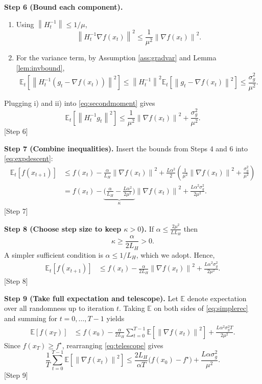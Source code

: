 \documentclass{article}
\newcommand{\E}{\mathbb{E}}
\newcommand{\norm}[1]{\left\lVert #1\right\rVert}
\begin{document}
\noindent\textbf{Step 6 (Bound each component).}
\begin{enumerate}[label=\roman*)]
    \item Using $\norm{H_t^{-1}}\le 1/\mu$,
    \[
        \norm{H_t^{-1}\nabla f(x_t)}^{2}\le\frac{1}{\mu^{2}}\norm{\nabla f(x_t)}^{2}.
    \]
    \item For the variance term, by Assumption \ref{ass:gradvar} and Lemma \ref{lem:invbound},
    \[
        \E_t\!\left[\norm{H_t^{-1}(g_t-\nabla f(x_t))}^{2}\right]
        \le \norm{H_t^{-1}}^{2}\E_t\!\left[\norm{g_t-\nabla f(x_t)}^{2}\right]
        \le\frac{\sigma_g^{2}}{\mu^{2}} .
    \]
\end{enumerate}
Plugging i) and ii) into \eqref{eq:secondmoment} gives
\[
    \E_t\!\left[\norm{H_t^{-1}g_t}^{2}\right]
    \le\frac{1}{\mu^{2}}\norm{\nabla f(x_t)}^{2}+\frac{\sigma_g^{2}}{\mu^{2}}.
    \tag{7}\label{eq:boundsecond}
\]
[Step 6]

\noindent\textbf{Step 7 (Combine inequalities).}  
Insert the bounds from Steps 4 and 6 into \eqref{eq:expdescent}:
\begin{align}
    \E_t[f(x_{t+1})]
    &\le f(x_t)-\frac{\alpha}{L_H}\norm{\nabla f(x_t)}^{2}
      +\frac{L\alpha^{2}}{2}\!\left(\frac{1}{\mu^{2}}\norm{\nabla f(x_t)}^{2}
      +\frac{\sigma_g^{2}}{\mu^{2}}\right) \nonumber\\[0.4em]
    &= f(x_t)-\underbrace{\Big(\frac{\alpha}{L_H}
        -\frac{L\alpha^{2}}{2\mu^{2}}\Big)}_{\displaystyle\kappa}
        \norm{\nabla f(x_t)}^{2}
      +\frac{L\alpha^{2}\sigma_g^{2}}{2\mu^{2}} .
    \tag{8}\label{eq:recursion}
\end{align}
[Step 7]

\noindent\textbf{Step 8 (Choose step size to keep $\kappa>0$).}  
If $\alpha\le\frac{2\mu^{2}}{L L_H}$ then
\[
    \kappa\ge\frac{\alpha}{2L_H}>0.
\]
A simpler sufficient condition is $\alpha\le 1/L_H$, which we adopt. Hence,
\begin{align}
    \E_t[f(x_{t+1})]
    &\le f(x_t)-\frac{\alpha}{2L_H}\norm{\nabla f(x_t)}^{2}
      +\frac{L\alpha^{2}\sigma_g^{2}}{2\mu^{2}} .
    \tag{9}\label{eq:simplerec}
\end{align}
[Step 8]

\noindent\textbf{Step 9 (Take full expectation and telescope).}  
Let $\E$ denote expectation over all randomness up to iteration $t$. Taking $\E$ on both sides of \eqref{eq:simplerec} and summing for $t=0,\dots,T-1$ yields
\begin{align}
    \E[f(x_T)] 
    &\le f(x_0)-\frac{\alpha}{2L_H}\sum_{t=0}^{T-1}\E\!\left[\norm{\nabla f(x_t)}^{2}\right]
      +\frac{L\alpha^{2}\sigma_g^{2}T}{2\mu^{2}} .
    \tag{10}\label{eq:telescope}
\end{align}
Since $f(x_T)\ge f^\star$, rearranging \eqref{eq:telescope} gives
\[
    \frac{1}{T}\sum_{t=0}^{T-1}\E\!\left[\norm{\nabla f(x_t)}^{2}\right]
    \le \frac{2L_H}{\alpha T}\big(f(x_0)-f^\star\big)
      +\frac{L\alpha\sigma_g^{2}}{\mu^{2}} .
    \tag{11}
\]
[Step 9]
\end{document}
